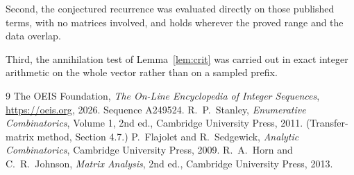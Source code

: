 \documentclass[11pt,a4paper]{article}
\theoremstyle{plain}
\theoremstyle{definition}
\begin{document}
Second, the conjectured recurrence was evaluated directly on those published terms, with no
matrices involved, and holds wherever the proved range and the data overlap.

Third, the annihilation test of Lemma~\ref{lem:crit} was carried out in exact integer
arithmetic on the whole vector rather than on a sampled prefix.

\begin{thebibliography}{9}
 The OEIS Foundation, \emph{The On-Line Encyclopedia of Integer
Sequences}, \url{https://oeis.org}, 2026. Sequence A249524.
 R.~P.~Stanley, \emph{Enumerative Combinatorics}, Volume 1, 2nd ed.,
Cambridge University Press, 2011. (Transfer-matrix method, Section 4.7.)
 P.~Flajolet and R.~Sedgewick, \emph{Analytic Combinatorics}, Cambridge
University Press, 2009.
 R.~A.~Horn and C.~R.~Johnson, \emph{Matrix Analysis}, 2nd ed., Cambridge
University Press, 2013.
\end{thebibliography}
\end{document}
